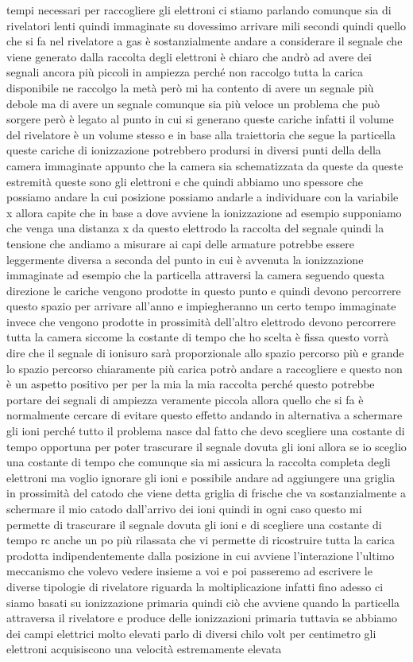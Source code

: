 {tempi necessari per raccogliere gli elettroni ci stiamo parlando comunque sia di rivelatori lenti quindi immaginate su dovessimo arrivare mili secondi quindi quello che si fa nel rivelatore a gas è sostanzialmente andare a considerare il segnale che viene generato dalla raccolta degli elettroni è chiaro che andrò ad avere dei segnali ancora più piccoli in ampiezza perché non raccolgo tutta la carica disponibile ne raccolgo la metà però mi ha contento di avere un segnale più debole ma di avere un segnale comunque sia più veloce un problema che può sorgere però è legato al punto in cui si generano queste cariche infatti il volume del rivelatore è un volume stesso e in base alla traiettoria che segue la particella queste cariche di ionizzazione potrebbero prodursi in diversi punti della della camera immaginate appunto che la camera sia schematizzata da queste da queste estremità queste sono gli elettroni e che quindi abbiamo uno spessore che possiamo andare la cui posizione possiamo andarle a individuare con la variabile x allora capite che in base a dove avviene la ionizzazione ad esempio supponiamo che venga una distanza x da questo elettrodo la raccolta del segnale quindi la tensione che andiamo a misurare ai capi delle armature potrebbe essere leggermente diversa a seconda del punto in cui è avvenuta la ionizzazione immaginate ad esempio che la particella attraversi la camera seguendo questa direzione le cariche vengono prodotte in questo punto e quindi devono percorrere questo spazio per arrivare all'anno e impiegheranno un certo tempo immaginate invece che vengono prodotte in prossimità dell'altro elettrodo devono percorrere tutta la camera siccome la costante di tempo che ho scelta è fissa questo vorrà dire che il segnale di ionisuro sarà proporzionale allo spazio percorso più e grande lo spazio percorso chiaramente più carica potrò andare a raccogliere e questo non è un aspetto positivo per per la mia la mia raccolta perché questo potrebbe portare dei segnali di ampiezza veramente piccola allora quello che si fa è normalmente cercare di evitare questo effetto andando in alternativa a schermare gli ioni perché tutto il problema nasce dal fatto che devo scegliere una costante di tempo opportuna per poter trascurare il segnale dovuta gli ioni allora se io sceglio una costante di tempo che comunque sia mi assicura la raccolta completa degli elettroni ma voglio ignorare gli ioni e possibile andare ad aggiungere una griglia in prossimità del catodo che viene detta griglia di frische che va sostanzialmente a schermare il mio catodo dall'arrivo dei ioni quindi in ogni caso questo mi permette di trascurare il segnale dovuta gli ioni e di scegliere una costante di tempo rc anche un po più rilassata che vi permette di ricostruire tutta la carica prodotta indipendentemente dalla posizione in cui avviene l'interazione l'ultimo meccanismo che volevo vedere insieme a voi e poi passeremo ad escrivere le diverse tipologie di rivelatore riguarda la moltiplicazione infatti fino adesso ci siamo basati su ionizzazione primaria quindi ciò che avviene quando la particella attraversa il rivelatore e produce delle ionizzazioni primaria tuttavia se abbiamo dei campi elettrici molto elevati parlo di diversi chilo volt per centimetro gli elettroni acquisiscono una velocità estremamente elevata }
